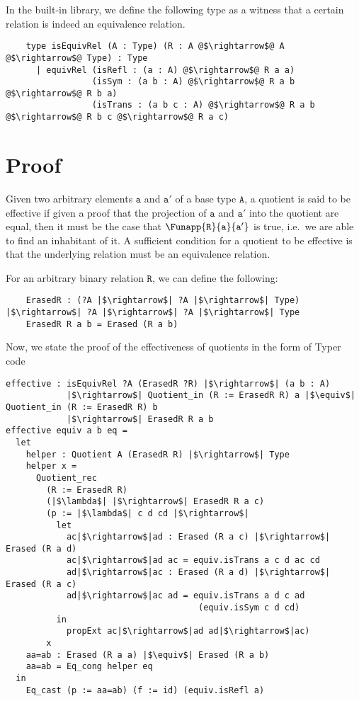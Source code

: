 \documentclass[12pt,twoside,maitrise]{dms}
\theoremstyle{definition}
\numberwithin{equation}{section}
\numberwithin{table}{chapter}
\numberwithin{figure}{chapter}
\newcommand\id[1] {\texttt{#1}}
\begin{document}
In the built-in library, we define the following type as a witness that a
certain relation is indeed an equivalence relation.

\begin{verbatim}
    type isEquivRel (A : Type) (R : A @$\rightarrow$@ A @$\rightarrow$@ Type) : Type
      | equivRel (isRefl : (a : A) @$\rightarrow$@ R a a)
                 (isSym : (a b : A) @$\rightarrow$@ R a b @$\rightarrow$@ R b a)
                 (isTrans : (a b c : A) @$\rightarrow$@ R a b @$\rightarrow$@ R b c @$\rightarrow$@ R a c)
\end{verbatim}

\section{Proof}
Given two arbitrary elements $\id{a}$ and $\id{a}'$ of a base type $\id{A}$, a
quotient is said to be effective if given a proof that the projection of $\id{a}$
and $\id{a}'$ into the quotient are equal, then it must be the case that
$\Funapp{\id{R}}{\id{a}}{\id{a}'}$ is true, i.e.\ we are able to find an
inhabitant of it. A sufficient condition for a quotient to be effective is that
the underlying relation must be an equivalence relation.

For an arbitrary binary relation $\id{R}$, we can define the following:

\begin{verbatim}
    ErasedR : (?A |$\rightarrow$| ?A |$\rightarrow$| Type) |$\rightarrow$| ?A |$\rightarrow$| ?A |$\rightarrow$| Type
    ErasedR R a b = Erased (R a b)
\end{verbatim}

Now, we state the proof of the effectiveness of quotients in the form of Typer code

\begin{verbatim}
effective : isEquivRel ?A (ErasedR ?R) |$\rightarrow$| (a b : A)
            |$\rightarrow$| Quotient_in (R := ErasedR R) a |$\equiv$| Quotient_in (R := ErasedR R) b
            |$\rightarrow$| ErasedR R a b
effective equiv a b eq =
  let
    helper : Quotient A (ErasedR R) |$\rightarrow$| Type
    helper x =
      Quotient_rec
        (R := ErasedR R)
        (|$\lambda$| |$\rightarrow$| ErasedR R a c)
        (p := |$\lambda$| c d cd |$\rightarrow$|
          let
            ac|$\rightarrow$|ad : Erased (R a c) |$\rightarrow$| Erased (R a d)
            ac|$\rightarrow$|ad ac = equiv.isTrans a c d ac cd
            ad|$\rightarrow$|ac : Erased (R a d) |$\rightarrow$| Erased (R a c)
            ad|$\rightarrow$|ac ad = equiv.isTrans a d c ad
                                      (equiv.isSym c d cd)
          in
            propExt ac|$\rightarrow$|ad ad|$\rightarrow$|ac)
        x
    aa=ab : Erased (R a a) |$\equiv$| Erased (R a b)
    aa=ab = Eq_cong helper eq
  in
    Eq_cast (p := aa=ab) (f := id) (equiv.isRefl a)
\end{verbatim}
\end{document}
